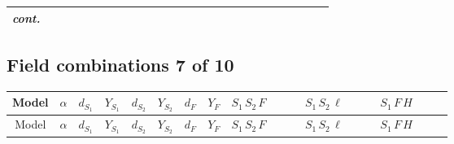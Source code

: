 \documentclass[8pt]{article}
\begin{document}
\begin{landscape}
\begin{longtable}{@{}cccccccc >{\raggedright\arraybackslash}p{0.21\linewidth} >{\raggedright\arraybackslash}p{0.21\linewidth} >{\raggedright\arraybackslash}p{0.21\linewidth}@{}}
\textit{cont.} &  &  &  &  &  &  &  &  &  & \scriptsize\adjustbox{max width=\linewidth}{$\begin{gathered} -\frac{\hbar  \overline{y_{2,i_1,r_1}} H_{a_1} H_{a_2} S_{1,j_2} y_{2,i_1,r_1} \mathcal{I}_{T3,a_1,a_2,j_2,j_1} \lambda_5 S_{2,j_1}{}^{\dagger }}{2 \sqrt{3}}\end{gathered}$} \\
\midrule
\bottomrule
\end{longtable}
\clearpage
\subsection*{Field combinations 7 of 10}
\begin{longtable}{@{}cccccccc >{\raggedright\arraybackslash}p{0.21\linewidth} >{\raggedright\arraybackslash}p{0.21\linewidth} >{\raggedright\arraybackslash}p{0.21\linewidth}@{}}
\toprule
Model & $\alpha$ & $d_{S_1}$ & $Y_{S_1}$ & $d_{S_2}$ & $Y_{S_2}$ & $d_F$ & $Y_F$ & $S_1\,S_2\,F$ & $S_1\,S_2\,\ell$ & $S_1\,F\,H$ \\
\midrule
\endfirsthead
\toprule
Model & $\alpha$ & $d_{S_1}$ & $Y_{S_1}$ & $d_{S_2}$ & $Y_{S_2}$ & $d_F$ & $Y_F$ & $S_1\,S_2\,F$ & $S_1\,S_2\,\ell$ & $S_1\,F\,H$ \\
\midrule
\endhead

\end{longtable}
\end{landscape}
\end{document}

